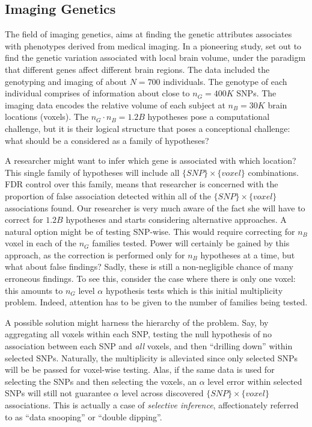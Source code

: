 \documentclass[draft,12pt]{article}
\begin{document}


\subsection{\label{eg:imaging_genetics}Imaging Genetics}
The field of imaging genetics, aims at finding the genetic attributes associates with phenotypes derived from medical imaging. In a pioneering study, \citet{stein_voxelwise_2010} set out to find the genetic variation associated with local brain volume, under the paradigm that different genes affect different brain regions. The data included the genotyping and imaging of about $N=700$ individuals. The genotype of each individual comprises of information about close to $n_G=400K$ SNPs. The imaging data encodes the relative volume of each subject at $n_B=30K$ brain locations (voxels). The $n_G \cdot n_B=1.2B$ hypotheses pose a computational challenge, but it is their logical structure that poses a conceptional challenge: what should be a considered as a family of hypotheses?

A researcher might want to infer which gene is associated with which location? This single family of hypotheses will include all $\{SNP\} \times \{voxel\}$ combinations. FDR control over this family, means that researcher is concerned with the proportion of false association detected within all of the $\{SNP\} \times \{voxel\}$ associations found. Our researcher is very much aware of the fact she will have to correct for $1.2B$ hypotheses and starts considering alternative approaches. A natural option might be of testing SNP-wise. This would require correcting for $n_B$ voxel in each of the $n_G$  families tested. Power will certainly be gained by this approach, as the correction is performed only for $n_B$ hypotheses at a time, but what about false findings? Sadly, these is still a non-negligible chance of many erroneous findings. To see this, consider the case where there is only one voxel: this amounts to $n_G$ level $\alpha$ hypothesis tests which is this initial multiplicity problem. Indeed, attention has to be given to the number of families being tested. 

A possible solution might harness the hierarchy of the problem. Say, by aggregating all voxels within each SNP, testing the null hypothesis of no association between each SNP and \emph{all} voxels, and then ``drilling down'' within selected SNPs. Naturally, the multiplicity is alleviated since only selected SNPs will be be passed for voxel-wise testing. Alas, if the same data is used for selecting the SNPs and then selecting the voxels, an $\alpha$ level error within selected SNPs will still not guarantee $\alpha$ level across discovered $\{SNP\} \times \{voxel\}$ associations. This is actually a case of \emph{selective inference}, affectionately  referred to as ``data snooping'' or ``double dipping''. 
\end{document}
